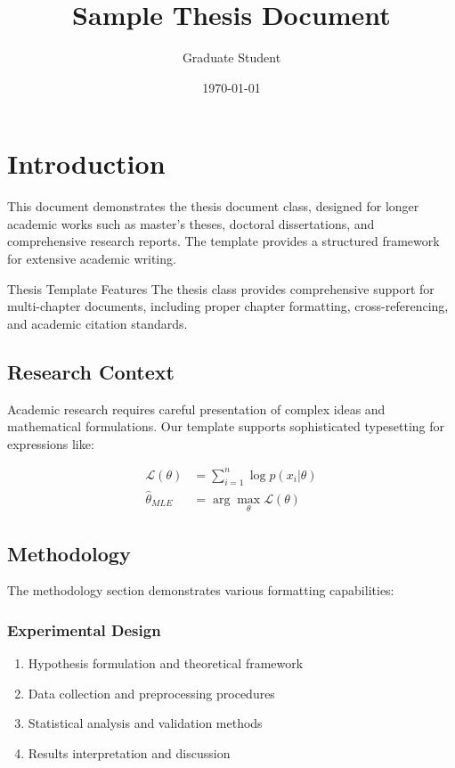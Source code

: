 \documentclass[12pt,cjk]{e_class_thesis}
\title{Sample Thesis Document}
\author{Graduate Student}
\date{\today}
\begin{document}
\maketitle
\mytoc

\chapter{Introduction}

This document demonstrates the thesis document class, designed for longer academic works such as master's theses, doctoral dissertations, and comprehensive research reports. The template provides a structured framework for extensive academic writing.

\begin{callout}{Thesis Template Features}
    The thesis class provides comprehensive support for multi-chapter documents, including proper chapter formatting, cross-referencing, and academic citation standards.
\end{callout}

\section{Research Context}

Academic research requires careful presentation of complex ideas and mathematical formulations. Our template supports sophisticated typesetting for expressions like:

\begin{align}
    \mathcal{L}(\theta) &= \sum_{i=1}^{n} \log p(x_i|\theta) \\
    \hat{\theta}_{MLE} &= \arg\max_{\theta} \mathcal{L}(\theta)
\end{align}

\section{Methodology}

The methodology section demonstrates various formatting capabilities:

\subsection{Experimental Design}
\begin{enumerate}
    \item Hypothesis formulation and theoretical framework
    \item Data collection and preprocessing procedures
    \item Statistical analysis and validation methods
    \item Results interpretation and discussion
\end{enumerate}
\end{document}
